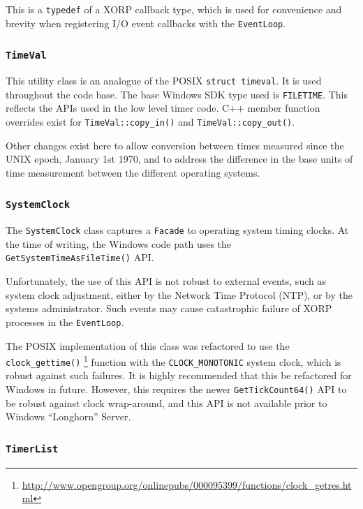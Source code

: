 \documentclass[11pt]{article}
\begin{document}
This is a {\tt typedef} of a XORP callback type, which is used
for convenience and brevity when registering I/O event callbacks
with the {\tt EventLoop}.

\subsubsection{{\tt TimeVal}}

This utility class is an analogue of the POSIX {\tt struct timeval}. It is
used throughout the code base.
The base Windows SDK type used is {\tt FILETIME}. This reflects the APIs
used in the low level timer code.
C++ member function overrides exist for {\tt TimeVal::copy\_in()}
and {\tt TimeVal::copy\_out()}.

Other changes exist here to allow conversion between
times measured since the UNIX epoch, January 1st 1970,
and to address the difference in the base units of time
measurement between the different operating systems.

\subsubsection{{\tt SystemClock}}

The {\tt SystemClock} class captures a {\tt Facade} to operating
system timing clocks.
At the time of writing, the Windows code path uses the
{\tt GetSystemTimeAsFileTime()} API.

Unfortunately, the use of this API is not robust
to external events, such as system clock
adjustment, either by the Network Time Protocol (NTP),
or by the systems administrator.
Such events may cause catastrophic failure of
XORP processes in the {\tt EventLoop}.

The POSIX implementation of this class was refactored
to use the {\tt clock\_gettime()}
\footnote{\url{http://www.opengroup.org/onlinepubs/000095399/functions/clock_getres.html}}
function with the {\tt CLOCK\_MONOTONIC}
system clock, which is robust against such failures.
It is highly recommended that this be refactored for Windows in
future.
However, this requires the newer {\tt GetTickCount64()}
API to be robust against clock wrap-around, and this API
is not available prior to Windows ``Longhorn'' Server.

\subsubsection{{\tt TimerList}}
\end{document}
